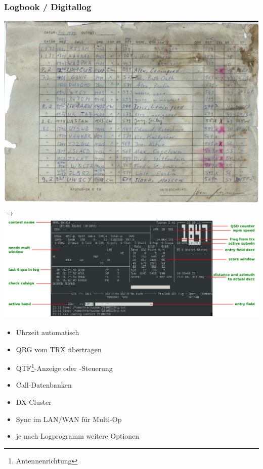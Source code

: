 \begin{frame}
    \frametitle{Logbook / Digitallog}

    \begin{center}
        \includegraphics[height=0.25\textheight]{bv13/DK0TU_LOG_KW_1972-02_Auszug.jpg}
        \hspace{2pc}$\rightarrow$\hspace{1pc}
        \includegraphics[height=0.25\textheight]{bv13/tucnak_Hf-10.png}
        \tiny \hyperlink{refs}{\cite{tucn}}
    \end{center}

    \begin{itemize}
        \item Uhrzeit automatisch
        \item QRG vom TRX übertragen
        \item QTF\footnote{Antennenrichtung}-Anzeige oder -Steuerung
        \item Call-Datenbanken
        \item DX-Cluster
        \item Sync im LAN/WAN für Multi-Op
        \item je nach Logprogramm weitere Optionen
    \end{itemize}

\end{frame}

